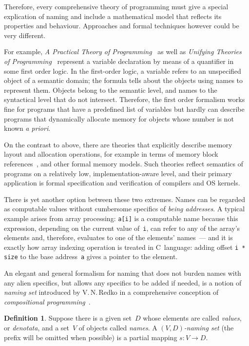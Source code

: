 \documentclass{article}
\theoremstyle{definition}
\newtheorem{Df}{Definition}
\begin{document}
Therefore, every comprehensive theory of programming must give a special
explication of naming and include a mathematical model that reflects its
properties and behaviour.  Approaches and formal techniques however could be
very different.

For example, \emph{A Practical Theory of Programming}~\cite{bib:ptop} as well
as \emph{Unifying Theories of Programming}~\cite{bib:utp} represent a variable
declaration by means of a quantifier in some first order logic.  In the
first-order logic, a variable refers to an unspecified object of a semantic
domain; the formula tells about the objects using names to represent them.
Objects belong to the semantic level, and names to the syntactical level that
do not intersect.  Therefore, the first order formalism works fine for programs
that have a predefined list of variables but hardly can describe programs that
dynamically allocate memory for objects whose number is not known \emph{a
priori}.

On the contrast to above, there are theories that explicitly describe memory
layout and allocation operations, for example in terms of memory block
references~\cite{bib:leroy}, and other formal memory models.
Such theories reflect semantics of programs on a
relatively low, implementation-aware level, and their primary application is
formal specification and verification of compilers and OS kernels.

There is yet another option between these two extremes.  Names can be regarded
as computable values without cumbersome specifics of \emph{being addresses}.  A
typical example arises from array processing: \lstinline{a[i]} is a computable
name because this expression, depending on the current value of~\lstinline{i},
can refer to any of the array's elements and, therefore, evaluates to one of
the elements' names~--- and it is exactly how array indexing operation is
treated in C~language: adding offset \lstinline{i * size} to the base
address~\lstinline{a} gives a pointer to the element.

An elegant and general formalism for naming that does not burden names
with any alien specifics, but allows any specifics to be added if needed,
is a notion of \emph{naming set} introduced by V.\,N.\,Redko in a
comprehensive conception of \emph{compositional programming}~\cite{bib:redko}.

\begin{Df}\label{df:naming-set}
Suppose there is a given set~$D$ whose elements are called \emph{values}, or
\emph{denotata}, and a set~$V$ of objects called \emph{names}.
A \emph{$(V,D)$-naming set} (the prefix will be omitted when possible) is a
partial mapping $s: V\to D$.
\end{Df}
\end{document}
